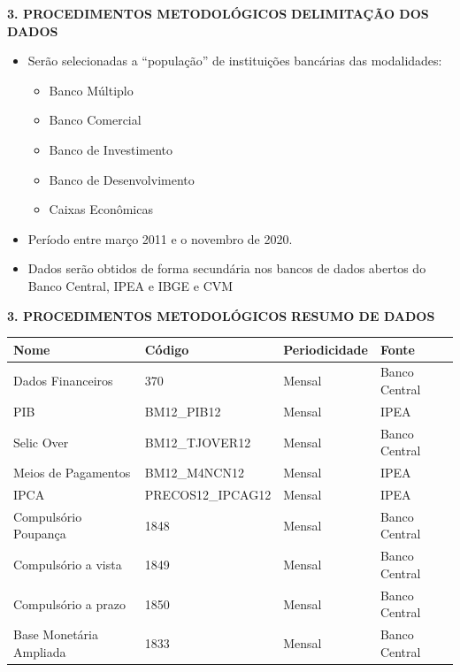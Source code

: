 \documentclass[
  ignorenonframetext,
  aspectratio=169,
  ignorenonframetext]{beamer}
\providecommand{\tightlist}{%
  \setlength{\itemsep}{0pt}\setlength{\parskip}{0pt}}
\begin{document}
\begin{frame}{\textbf{3. PROCEDIMENTOS METODOLÓGICOS}}
\protect\hypertarget{procedimentos-metodoluxf3gicos-1}{}
\textbf{DELIMITAÇÃO DOS DADOS}

\begin{itemize}
\item
  Serão selecionadas a ``população'' de instituições bancárias das
  modalidades:

  \begin{itemize}
  \tightlist
  \item
    Banco Múltiplo
  \item
    Banco Comercial
  \item
    Banco de Investimento
  \item
    Banco de Desenvolvimento
  \item
    Caixas Econômicas
  \end{itemize}
\item
  Período entre março 2011 e o novembro de 2020.
\item
  Dados serão obtidos de forma secundária nos bancos de dados abertos do
  Banco Central, IPEA e IBGE e CVM
\end{itemize}
\end{frame}

\begin{frame}{\textbf{3. PROCEDIMENTOS METODOLÓGICOS}}
\protect\hypertarget{procedimentos-metodoluxf3gicos-2}{}
\textbf{RESUMO DE DADOS}

\begin{longtable}[]{@{}llll@{}}
\toprule
\textbf{Nome} & \textbf{Código} & \textbf{Periodicidade} &
\textbf{Fonte} \\
\midrule
\endhead
Dados Financeiros & 370 & Mensal & Banco Central \\
PIB & BM12\_PIB12 & Mensal & IPEA \\
Selic Over & BM12\_TJOVER12 & Mensal & Banco Central \\
Meios de Pagamentos & BM12\_M4NCN12 & Mensal & IPEA \\
IPCA & PRECOS12\_IPCAG12 & Mensal & IPEA \\
Compulsório Poupança & 1848 & Mensal & Banco Central \\
Compulsório a vista & 1849 & Mensal & Banco Central \\
Compulsório a prazo & 1850 & Mensal & Banco Central \\
Base Monetária Ampliada & 1833 & Mensal & Banco Central \\
\bottomrule
\end{longtable}
\end{frame}
\end{document}
